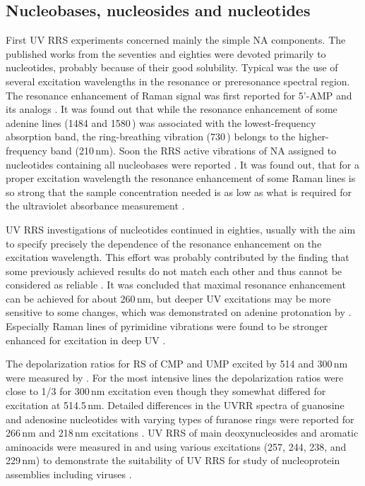 \subsection{Nucleobases, nucleosides and nucleotides}

First UV RRS experiments concerned mainly the simple NA components.
The published works from the seventies and eighties were devoted primarily to
nucleotides, probably because of their good solubility.
Typical was the use of several excitation wavelengths in the resonance or
preresonance spectral region.
The resonance enhancement of Raman signal was first reported for 5'-AMP and its
analogs
\parencite{%
	Tsuboi1974,%
	Pezolet1975,%
	Blazej1977%
}.
It was found out that while the resonance enhancement of some adenine lines
(1484 and 1580\,\icm{}) was associated with the lowest-frequency absorption
band, the ring-breathing vibration (730\,\icm{}) belongs to the
higher-frequency band (210\,nm).
Soon the RRS active vibrations of NA assigned to nucleotides containing all
nucleobases were reported
\parencite{%
	Chinsky1978,%
	Nishimura1977%
}.
It was found out, that for a proper excitation wavelength the resonance
enhancement of some Raman lines is so strong that the sample concentration
needed is as low as what is required for the ultraviolet absorbance measurement
\parencite{Nishimura1977}.

UV RRS investigations of nucleotides continued in eighties, usually with the
aim to specify precisely the dependence of the resonance enhancement on the
excitation wavelength.
This effort was probably contributed by the finding that some previously
achieved results do not match each other and thus cannot be considered as
reliable
\parencite{Bushaw1980}.
It was concluded that maximal resonance enhancement can be achieved for about
260\,nm, but deeper UV excitations may be more sensitive to some changes,
which was demonstrated on adenine protonation by
\textcite{Kubasek1985}.
Especially Raman lines of pyrimidine vibrations were found to be stronger
enhanced for excitation in deep UV
\parencite{%
	Ziegler1984,%
	Fodor1985%
}.

The depolarization ratios for RS of CMP and UMP excited by 514 and 300\,nm were
measured by
\textcite{Blazej1980}.
For the most intensive lines the depolarization ratios were close to 1/3 for
300\,nm excitation even though they somewhat differed for excitation at
514.5\,nm.
Detailed differences in the UVRR spectra of guanosine and adenosine nucleotides
with varying types of furanose rings were reported for 266\,nm and 218\,nm
excitations
\parencite{Nishimura1987}.
UV RRS of main deoxynucleosides and aromatic aminoacids were measured in
 and  using various excitations (257, 244, 238, and 229\,nm) to
demonstrate the suitability of UV RRS for study of nucleoprotein assemblies
including viruses
\parencite{Wen1998}.

